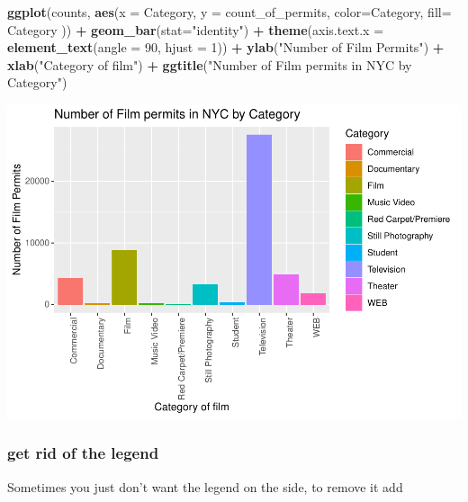 \documentclass[]{book}
\newenvironment{Shaded}{\begin{snugshade}}{\end{snugshade}}
\newcommand{\KeywordTok}[1]{\textcolor[rgb]{0.13,0.29,0.53}{\textbf{#1}}}
\newcommand{\DataTypeTok}[1]{\textcolor[rgb]{0.13,0.29,0.53}{#1}}
\newcommand{\DecValTok}[1]{\textcolor[rgb]{0.00,0.00,0.81}{#1}}
\newcommand{\StringTok}[1]{\textcolor[rgb]{0.31,0.60,0.02}{#1}}
\newcommand{\OperatorTok}[1]{\textcolor[rgb]{0.81,0.36,0.00}{\textbf{#1}}}
\newcommand{\NormalTok}[1]{#1}
\begin{document}
\begin{Shaded}
\begin{Highlighting}[]
\KeywordTok{ggplot}\NormalTok{(counts, }\KeywordTok{aes}\NormalTok{(}\DataTypeTok{x =}\NormalTok{ Category, }\DataTypeTok{y =}\NormalTok{ count_of_permits, }
                   \DataTypeTok{color=}\NormalTok{Category, }
                   \DataTypeTok{fill=}\NormalTok{ Category )) }\OperatorTok{+}
\StringTok{  }\KeywordTok{geom_bar}\NormalTok{(}\DataTypeTok{stat=}\StringTok{"identity"}\NormalTok{) }\OperatorTok{+}\StringTok{ }
\StringTok{  }\KeywordTok{theme}\NormalTok{(}\DataTypeTok{axis.text.x =} \KeywordTok{element_text}\NormalTok{(}\DataTypeTok{angle =} \DecValTok{90}\NormalTok{, }\DataTypeTok{hjust =} \DecValTok{1}\NormalTok{)) }\OperatorTok{+}
\StringTok{  }\KeywordTok{ylab}\NormalTok{(}\StringTok{"Number of Film Permits"}\NormalTok{) }\OperatorTok{+}\StringTok{ }
\StringTok{  }\KeywordTok{xlab}\NormalTok{(}\StringTok{"Category of film"}\NormalTok{) }\OperatorTok{+}
\StringTok{  }\KeywordTok{ggtitle}\NormalTok{(}\StringTok{"Number of Film permits in NYC by Category"}\NormalTok{)}
\end{Highlighting}
\end{Shaded}

\includegraphics{Statistics_Lab_files/figure-latex/1categoryG-1.pdf}

\subsubsection{get rid of the legend}\label{get-rid-of-the-legend}

Sometimes you just don't want the legend on the side, to remove it add
\end{document}
